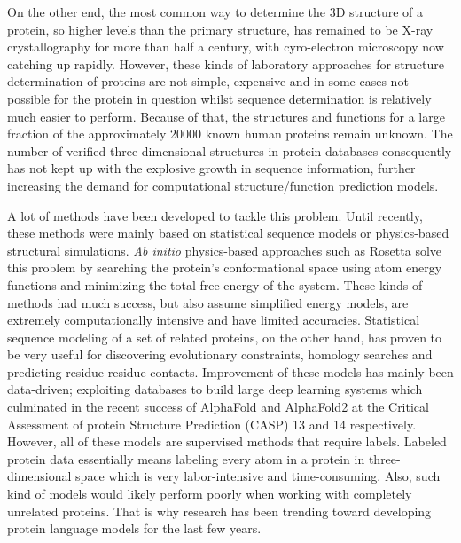 On the other end, the most common way to determine the 3D structure of a protein, so higher levels than the primary structure, has remained to be X-ray crystallography for more than half a century\cite{xray}, with cyro-electron microscopy now catching up rapidly\cite{cyroem}. However, these kinds of laboratory approaches for structure determination of proteins are not simple, expensive and in some cases not possible for the protein in question whilst sequence determination is relatively much easier to perform. Because of that, the structures and functions for a large fraction of the approximately 20000 known human proteins remain unknown. The number of verified three-dimensional structures in protein databases consequently has not kept up with the explosive growth in sequence information, further increasing the demand for computational structure/function prediction models.

A lot of methods have been developed to tackle this problem. Until recently, these methods were mainly based on statistical sequence models or physics-based structural simulations. \textit{Ab initio} physics-based approaches such as Rosetta\cite{rosetta} solve this problem by searching the protein's conformational space using atom energy functions and minimizing the total free energy of the system. These kinds of methods had much success, but also assume simplified energy models, are extremely computationally intensive and have limited accuracies\cite{review}. Statistical sequence modeling of a set of related proteins, on the other hand, has proven to be very useful for discovering evolutionary constraints, homology searches and predicting residue-residue contacts. Improvement of these models has mainly been data-driven; exploiting databases to build large deep learning systems which culminated in the recent success of AlphaFold\cite{alphafold} and AlphaFold2\cite{alphafold2} at the Critical Assessment of protein Structure Prediction (CASP) 13 and 14 respectively. However, all of these models are supervised methods that require labels. Labeled protein data essentially means labeling every atom in a protein in three-dimensional space which is very labor-intensive and time-consuming. Also, such kind of models would likely perform poorly when working with completely unrelated proteins. That is why research has been trending toward developing protein language models for the last few years.